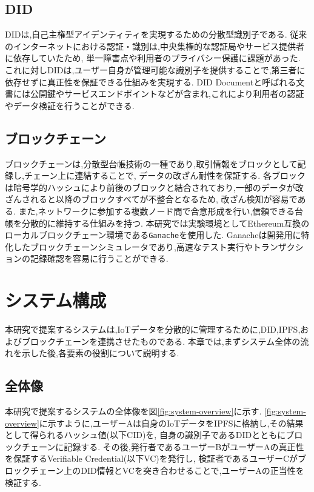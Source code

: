 \documentclass[a4paper,9pt,twocolumn]{ltjsarticle} %
\begin{document}
\subsection{DID}
DIDは,自己主権型アイデンティティを実現するための分散型識別子である.
従来のインターネットにおける認証・識別は,中央集権的な認証局やサービス提供者に依存していたため,
単一障害点や利用者のプライバシー保護に課題があった.
これに対しDIDは,ユーザー自身が管理可能な識別子を提供することで,第三者に依存せずに真正性を保証できる仕組みを実現する.
DID Documentと呼ばれる文書には公開鍵やサービスエンドポイントなどが含まれ,これにより利用者の認証やデータ検証を行うことができる.

\subsection{ブロックチェーン}
ブロックチェーンは,分散型台帳技術の一種であり,取引情報をブロックとして記録し,チェーン上に連結することで,
データの改ざん耐性を保証する.
各ブロックは暗号学的ハッシュにより前後のブロックと結合されており,一部のデータが改ざんされると以降のブロックすべてが不整合となるため,
改ざん検知が容易である.
また,ネットワークに参加する複数ノード間で合意形成を行い,信頼できる台帳を分散的に維持する仕組みを持つ.
本研究では実験環境としてEthereum互換のローカルブロックチェーン環境である\texttt{Ganache}を使用した.
Ganacheは開発用に特化したブロックチェーンシミュレータであり,高速なテスト実行やトランザクションの記録確認を容易に行うことができる.

\section{システム構成}
本研究で提案するシステムは,IoTデータを分散的に管理するために,DID,IPFS,およびブロックチェーンを連携させたものである.
本章では,まずシステム全体の流れを示した後,各要素の役割について説明する.

\subsection{全体像}
本研究で提案するシステムの全体像を図\ref{fig:system-overview}に示す.
\ref{fig:system-overview}に示すように,ユーザーAは自身のIoTデータをIPFSに格納し,その結果として得られるハッシュ値(以下CID)を,
自身の識別子であるDIDとともにブロックチェーンに記録する.
その後,発行者であるユーザーBがユーザーAの真正性を保証するVerifiable Credential(以下VC)を発行し,
検証者であるユーザーCがブロックチェーン上のDID情報とVCを突き合わせることで,ユーザーAの正当性を検証する.
\end{document}
